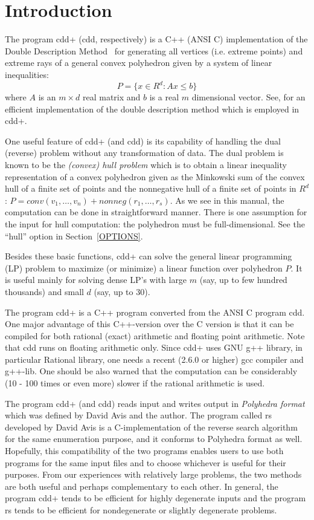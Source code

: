 \documentclass[11pt]{article}
\begin{document}
\section{Introduction} \label{INTRODUCTION}

The program  cdd+  (cdd, respectively)   is 
a C++  (ANSI C) implementation of 
the Double Description Method~\cite{mrtt-ddm-53}
for generating all vertices (i.e. extreme points)
and extreme rays of a general 
convex polyhedron given by a system of linear inequalities:
\[
   P = \{ x  \in R^d:  A  x  \le  b \}
\]
where $A$ is an $m \times d$ real matrix and $b$ is a real
$m$ dimensional vector.   See, \cite{fp-ddmr-95} for
an efficient implementation of the double description
method which is employed in cdd+.


One useful feature of  cdd+ (and cdd) is its capability
of handling the dual (reverse)  problem without any transformation
of data.  The dual problem is known to be the 
{\em (convex) hull problem\/} which
is to obtain a linear inequality representation
of a convex polyhedron given as the Minkowski sum of 
the convex hull of a finite set of points and the nonnegative
hull of a finite set of points in $R^d$: 
$P = conv(v_1,\ldots,v_n) +  nonneg(r_1,\ldots,r_s)$.
As we see in this manual, the computation can be done
in straightforward manner.  There is one assumption for the input
for hull computation: the polyhedron must be full-dimensional.
See the ``hull'' option in Section~\ref{OPTIONS}.

Besides these basic functions, cdd+ can solve the general
linear programming (LP) problem to maximize (or minimize) a linear
function over polyhedron $P$.   It is useful mainly for solving 
dense LP's with large $m$ (say, up to few hundred thousands) and small $d$ 
(say, up to 30).

The program cdd+ is a C++ program converted from the ANSI C
program cdd.  One major advantage of this C++-version over the C version is
that it can be compiled for both rational (exact) arithmetic and 
floating point arithmetic.  Note that cdd runs on floating
arithmetic only.  Since cdd+ uses GNU g++ library, in particular 
Rational library, one needs a recent (2.6.0 or higher) gcc compiler
and g++-lib.  One should be also warned that the computation
can be considerably  (10 - 100 times or even more) slower if the rational
arithmetic is used.

The program cdd+ (and cdd) reads input and writes output in 
{\em Polyhedra format\/} which was defined by David Avis and
the author.  The program called rs developed by David Avis is
a C-implementation of the reverse search algorithm~\cite{af-pachv-92} 
for the same enumeration purpose, and it conforms to Polyhedra format as well.
Hopefully, this compatibility of the two programs
enables users to use both programs for the same input files
and to choose whichever is useful for their purposes.
From our experiences with relatively large problems,
the two methods are both useful and perhaps complementary
to each other.  In general, the program cdd+ tends to be
efficient for highly degenerate inputs and the program rs
tends to be efficient for nondegenerate or slightly
degenerate problems.
\end{document}
